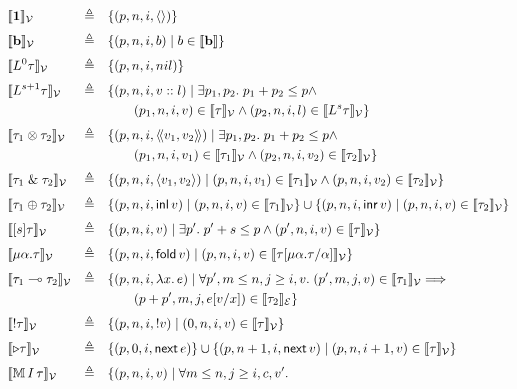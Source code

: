 \begin{figure}[H]
\small
\[
\begin{alignedat}{2}
&\vrel{\textbf{1}}
  &\quad\triangleq\quad&\{(p,n,i,\langle\rangle)\}\\[0.5ex]
&\vrel{\textbf{b}}
  &\quad\triangleq\quad& \{(p,n,i,b) \mid b\in \llbracket \textbf{b}\rrbracket\} \\[0.5ex]
&\vrel{L^0\tau}
  &\quad\triangleq\quad&\{(p,n,i,nil)\}\\[0.5ex]
&\vrel{L^{s+1}\tau}
  &\quad\triangleq\quad&
    \{(p,n,i,v::l)\mid\exists p_1,p_2.\;p_1+p_2\leq p \land\\
&&&\qquad(p_1,n,i,v)\in\vrel{\tau} \land
        (p_2,n,i,l)\in\vrel{L^s\tau}\}\\[0.5ex]
&\vrel{\tau_1\otimes\tau_2}
  &\quad\triangleq\quad&
    \{(p,n,i,\ttuple{v_1}{v_2})\mid\exists p_1,p_2.\;p_1+p_2\leq p \land\\
&&&\qquad(p_1,n,i,v_1)\in\vrel{\tau_1} \land
        (p_2,n,i,v_2)\in\vrel{\tau_2}\}\\[0.5ex]
&\vrel{\tau_1\;\&\;\tau_2}
  &\quad\triangleq\quad&
    \{(p,n,i,\tuple{v_1}{v_2})\mid
        (p,n,i,v_1)\in\vrel{\tau_1} \land
        (p,n,i,v_2)\in\vrel{\tau_2}\}\\[0.5ex]
&\vrel{\tau_1\oplus\tau_2}
  &\quad\triangleq\quad&
    \{(p,n,i,\mathsf{inl}\,v)\mid(p,n,i,v)\in\vrel{\tau_1}\}
        \cup\{(p,n,i,\mathsf{inr}\,v)\mid(p,n,i,v)\in\vrel{\tau_2}\}\\[0.5ex]
&\vrel{[s]\tau}
  &\quad\triangleq\quad&
    \{(p,n,i,v)\mid \exists p'.\;p'+s \leq p \land
      (p',n, i,v)\in\vrel{\tau}\}\\[0.5ex]
&\vrel{\mu\alpha.\tau}
  &\quad\triangleq\quad&
    \{(p,n,i,\fold v)\mid
      (p,n, i,v)\in\vrel{\tau[\mu\alpha.\tau/\alpha]}\}\\[0.5ex]
&\vrel{\tau_1\multimap\tau_2}
  &\quad\triangleq\quad&
    \{(p,n,i,\tlam{x}{e})\mid\forall p',m\leq n,j\geq i,v.\;
        (p',m,j,v)\in\vrel{\tau_1} \Longrightarrow\\
&&&\qquad(p+p',m,j,e[v/x])\in\erel{\tau_2}\}\\[0.5ex]
&\vrel{!\tau}
  &\quad\triangleq\quad&
    \{(p,n,i,!v)\mid(0,n,i,v)\in\vrel{\tau}\}\\[0.5ex]
&\vrel{\triangleright\tau}
  &\quad\triangleq\quad&
    \{(p,0,i,\delay e)\} \cup\{(p,n+1,i,\delay v)\mid
      (p,n,i+1,v)\in\vrel{\tau}\}\\[0.5ex]
&\vrel{\tmonad I\tau}
  &\quad\triangleq\quad&
    \{(p,n,i,v)\mid\forall m\leq n,j\geq i,c,v'.\;

\end{alignedat}\]
\end{figure}

